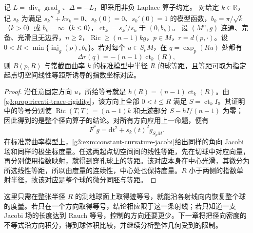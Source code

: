 \begin{theorem}\label{g3:thm:laplacian-equality-local-space-form}
	记 \(L=\operatorname{div}_g\operatorname{grad}_g\)、\(\Delta=-L\)，即采用非负 Laplace 算子约定。
	对给定 \(k\in\mathbb R\)，记 \(s_k\) 为满足 \(s_k''+ks_k=0\)、\(s_k(0)=0\)、\(s_k'(0)=1\) 的模型函数，\(b_k=\pi/\sqrt k\)（\(k>0\)）或 \(b_k=\infty\)（\(k\le0\)），\(\operatorname{ct}_k=s_k'/s_k\) 于 \((0,b_k)\)。
	设 \((M^n,g)\) 连通、完备、光滑且无边界，\(n\ge2\)，\(\operatorname{Ric}\ge(n-1)kg\)，\(p\in M\)，\(r=d(p,\cdot)\)。设 \(0<R<\min\{\operatorname{inj}_g(p),b_k\}\)。若对每个 \(u\in S_pM\)，在 \(q=\exp_p(Ru)\) 处都有
	\[
		\Delta r(q)=-(n-1)\operatorname{ct}_k(R),
	\]
	则 \(B(p,R)\) 与常截面曲率 \(k\) 的标准模型中半径 \(R\) 的球等距，且等距可取为指定起点切空间线性等距所诱导的指数坐标对应。
\end{theorem}
\begin{proof}
	沿任意固定方向 \(u\)，所给等号就是 \(h(R)=(n-1)\operatorname{ct}_k(R)\)。由\cref{g3:prop:riccati-trace-rigidity}，该方向上全部 \(0<t\le R\) 满足 \(S=\operatorname{ct}_k I\)。其证明中的等号分别使 \(\operatorname{Ric}(T,T)=(n-1)k\) 和无迹部分 \(S-hI/(n-1)\) 为零；因此得到的是整个径向算子的结论。对所有方向应用上一命题，便有
	\[
		F^*g=\mathrm{d}t^2+s_k(t)^2g_{S_pM}.
	\]
	在标准常曲率模型上，\cref{g3:exm:constant-curvature-jacobi}给出同样的角向 Jacobi 场和同样的极坐标度量。任选两起点切空间间的线性等距，先在切球中对应向量，再分别使用指数映射，就得到穿孔球上的等距。该对应本身在中心光滑，其微分为所选线性等距，所以由度量的连续性，中心处也保持度量。\(R\) 小于两侧的指数单射半径，故该对应是整个球的微分同胚与等距。
\end{proof}

这里只需在整张半径 \(R\) 的测地球面上取得迹等号，就能沿各射线向内恢复整个球的度量。若只在一个方向取得等号，结论相应限于这一条射线；若只知道一支 Jacobi 场的长度达到 Rauch 等号，控制的方向还要更少。下一章将把径向密度的不等式沿方向积分，得到球体积比较，并继续分析整体几何受到的限制。
